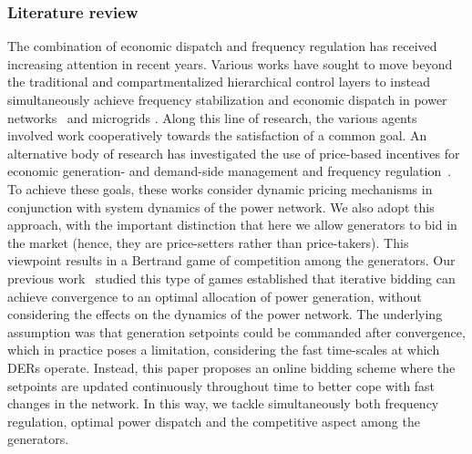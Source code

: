 \documentclass[journal]{IEEEtran}
\newcommand{\1}{\mathds 1}
\theoremstyle{remark}
\theoremstyle{definition}
\begin{document}
\subsubsection*{Literature review}
The combination of economic dispatch and frequency regulation has
received increasing attention in recent years. Various works have
sought to move beyond the traditional and compartmentalized
hierarchical control layers to instead simultaneously achieve
frequency stabilization and economic dispatch in power
networks~\cite{trip2016internal,zhangpapaautomatica,li2016connecting}
and microgrids \cite{cady2015distributed,dorfler2016breaking}. Along
this line of research, the various agents involved work cooperatively
towards the satisfaction of a common goal.  An alternative body of
research has investigated the use of price-based incentives for
economic generation- and demand-side management and frequency
regulation~\cite{alv_meng_power_coupl_market,DJS-MC-AMA:16,stegink2017unifying}.
To achieve these goals, these works consider dynamic pricing
mechanisms in conjunction with system dynamics of the power
network. We also adopt this approach, with the important distinction
that here we allow generators to bid in the market (hence, they are
price-setters rather than price-takers). This viewpoint results in a
Bertrand game of competition among the generators.  Our previous
work~\cite{cherukuri2017iterative,cherukuri2016decentralized} studied
this type of games established that iterative bidding can achieve
convergence to an optimal allocation of power generation, without
considering the effects on the dynamics of the power network. The
underlying assumption was that generation setpoints could be commanded
after convergence, which in practice poses a limitation, considering
the fast time-scales at which DERs operate.  Instead, this paper
proposes an online bidding scheme where the setpoints are updated
continuously throughout time to better cope with fast changes in the
network. In this way, we tackle simultaneously both frequency
regulation, optimal power dispatch and the competitive aspect among
the generators.
\end{document}
